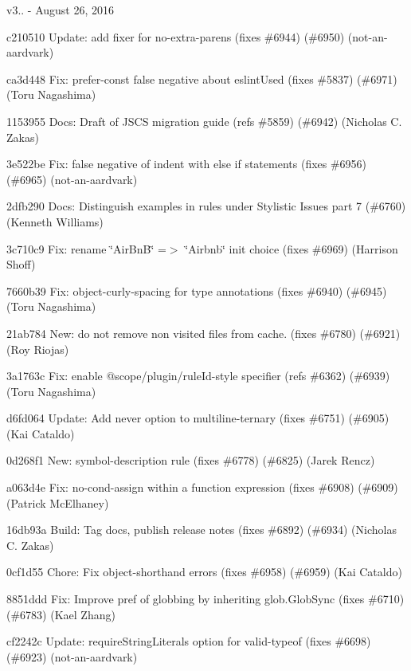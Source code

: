 v3.. -\/ August 26, 2016


\begin{DoxyItemize}
\item c210510 Update\+: add fixer for no-\/extra-\/parens (fixes \#6944) (\#6950) (not-\/an-\/aardvark)
\item ca3d448 Fix\+: {\ttfamily prefer-\/const} false negative about {\ttfamily eslint\+Used} (fixes \#5837) (\#6971) (Toru Nagashima)
\item 1153955 Docs\+: Draft of J\+S\+CS migration guide (refs \#5859) (\#6942) (Nicholas C. Zakas)
\item 3e522be Fix\+: false negative of {\ttfamily indent} with {\ttfamily else if} statements (fixes \#6956) (\#6965) (not-\/an-\/aardvark)
\item 2dfb290 Docs\+: Distinguish examples in rules under Stylistic Issues part 7 (\#6760) (Kenneth Williams)
\item 3c710c9 Fix\+: rename \char`\"{}\+Air\+Bn\+B\char`\"{} =$>$ \char`\"{}\+Airbnb\char`\"{} init choice (fixes \#6969) (Harrison Shoff)
\item 7660b39 Fix\+: {\ttfamily object-\/curly-\/spacing} for type annotations (fixes \#6940) (\#6945) (Toru Nagashima)
\item 21ab784 New\+: do not remove non visited files from cache. (fixes \#6780) (\#6921) (Roy Riojas)
\item 3a1763c Fix\+: enable {\ttfamily @scope/plugin/rule\+Id}-\/style specifier (refs \#6362) (\#6939) (Toru Nagashima)
\item d6fd064 Update\+: Add never option to multiline-\/ternary (fixes \#6751) (\#6905) (Kai Cataldo)
\item 0d268f1 New\+: {\ttfamily symbol-\/description} rule (fixes \#6778) (\#6825) (Jarek Rencz)
\item a063d4e Fix\+: no-\/cond-\/assign within a function expression (fixes \#6908) (\#6909) (Patrick Mc\+Elhaney)
\item 16db93a Build\+: Tag docs, publish release notes (fixes \#6892) (\#6934) (Nicholas C. Zakas)
\item 0cf1d55 Chore\+: Fix object-\/shorthand errors (fixes \#6958) (\#6959) (Kai Cataldo)
\item 8851ddd Fix\+: Improve pref of globbing by inheriting glob.\+Glob\+Sync (fixes \#6710) (\#6783) (Kael Zhang)
\item cf2242c Update\+: {\ttfamily require\+String\+Literals} option for {\ttfamily valid-\/typeof} (fixes \#6698) (\#6923) (not-\/an-\/aardvark)

\end{DoxyItemize}
